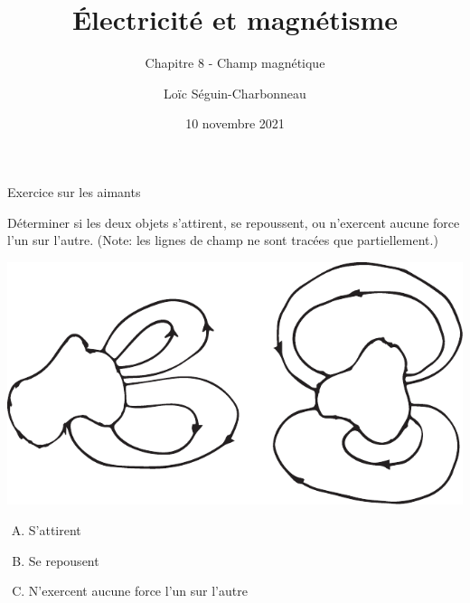 \documentclass{beamer}
\title{Électricité et magnétisme}
\subtitle{Chapitre 8 - Champ magnétique}
\date{10 novembre 2021}
\author{Loïc Séguin-Charbonneau}
\institute{Cégep Édouard-Montpetit}
\begin{document}
\maketitle

\begin{frame}[t]{Exercice sur les aimants}

  Déterminer si les deux objets s'attirent, se repoussent, ou n'exercent aucune
  force l'un sur l'autre. (Note: les lignes de champ ne sont tracées que
  partiellement.)

  \begin{center}
    \includegraphics[scale=0.6]{figures/exercice-champ-magnetique1a.pdf}
  \end{center}

  \begin{enumerate}[A.]
    \item S'attirent
    \item Se repousent
    \item N'exercent aucune force l'un sur l'autre
  \end{enumerate}

\end{frame}
\end{document}
